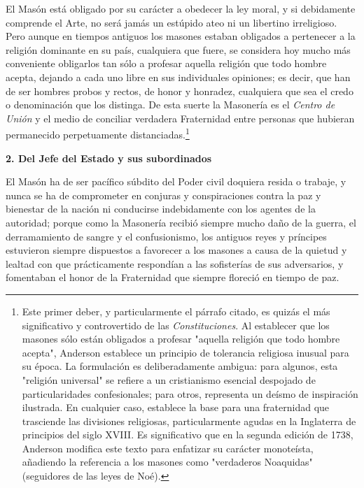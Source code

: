\documentclass[a4paper,12pt,twoside]{book}
\begin{document}
\noindent El Masón está obligado por su carácter a obedecer la ley moral, y si debidamente comprende el Arte, no será jamás un estúpido ateo ni un libertino irreligioso. Pero aunque en tiempos antiguos los masones estaban obligados a pertenecer a la religión dominante en su país, cualquiera que fuere, se considera hoy mucho más conveniente obligarlos tan sólo a profesar aquella religión que todo hombre acepta, dejando a cada uno libre en sus individuales opiniones; es decir, que han de ser hombres probos y rectos, de honor y honradez, cualquiera que sea el credo o denominación que los distinga. De esta suerte la Masonería es el \textit{Centro de Unión} y el medio de conciliar verdadera Fraternidad entre personas que hubieran permanecido perpetuamente distanciadas.\footnote{Este primer deber, y particularmente el párrafo citado, es quizás el más significativo y controvertido de las \textit{Constituciones}. Al establecer que los masones sólo están obligados a profesar "aquella religión que todo hombre acepta", Anderson establece un principio de tolerancia religiosa inusual para su época. La formulación es deliberadamente ambigua: para algunos, esta "religión universal" se refiere a un cristianismo esencial despojado de particularidades confesionales; para otros, representa un deísmo de inspiración ilustrada. En cualquier caso, establece la base para una fraternidad que trasciende las divisiones religiosas, particularmente agudas en la Inglaterra de principios del siglo XVIII. Es significativo que en la segunda edición de 1738, Anderson modifica este texto para enfatizar su carácter monoteísta, añadiendo la referencia a los masones como "verdaderos Noaquidas" (seguidores de las leyes de Noé).}

\vspace{0.5cm}

\noindent \textbf{2. Del Jefe del Estado y sus subordinados}

\noindent El Masón ha de ser pacífico súbdito del Poder civil doquiera resida o trabaje, y nunca se ha de comprometer en conjuras y conspiraciones contra la paz y bienestar de la nación ni conducirse indebidamente con los agentes de la autoridad; porque como la Masonería recibió siempre mucho daño de la guerra, el derramamiento de sangre y el confusionismo, los antiguos reyes y príncipes estuvieron siempre dispuestos a favorecer a los masones a causa de la quietud y lealtad con que prácticamente respondían a las sofisterías de sus adversarios, y fomentaban el honor de la Fraternidad que siempre floreció en tiempo de paz.
\end{document}
